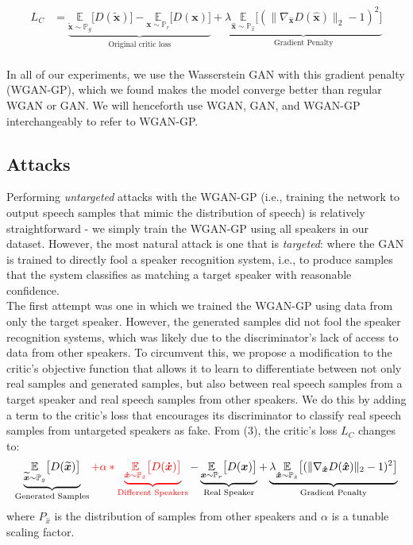 \begin{align}
    L_C &= \underbrace{\underset{\boldsymbol{\widetilde{x}} \sim \mathbb{P}_{g}}{\mathbb{E}}  \big[D(\boldsymbol{\widetilde{x}})\big] - \underset{\boldsymbol{x} \sim \mathbb{P}_{r}}{\mathbb{E}}  \big[D(\boldsymbol{x})\big]}_\text{Original critic loss}  + \underbrace{\lambda \underset{\boldsymbol{\hat{x}} \sim \mathbb{P}_{\hat{x}}}{\mathbb{E}}  \big[(\lVert \nabla_{\boldsymbol{\hat{x}}} D(\boldsymbol{\hat{x}}) \rVert_2 - 1)^2\big]}_\text{Gradient Penalty}
\end{align} \\
In all of our experiments, we use the Wasserstein GAN with this gradient penalty (WGAN-GP), which we found makes the model converge better than regular WGAN or GAN. We will henceforth use WGAN, GAN, and WGAN-GP interchangeably to refer to WGAN-GP.
\subsection{Attacks}
Performing \textit{untargeted} attacks with the WGAN-GP (i.e., training the network to output speech samples that mimic the distribution of speech) is relatively straightforward - we simply train the WGAN-GP using all speakers in our dataset. However, the most natural attack is one that is \textit{targeted}: where the GAN is trained to directly fool
a speaker recognition system, i.e., to produce samples that the system
classifies as matching a target speaker with reasonable confidence. \\
The first attempt was one in which we trained the WGAN-GP using data from only the target speaker. However, the generated samples did not fool
the speaker recognition systems, which was likely due to the discriminator's lack of access to data from other speakers. To circumvent this, we propose a 
modification to the critic's objective function that allows it to learn to 
differentiate between not only real samples and generated samples, but also between real speech samples from a target 
speaker and real speech samples from other speakers. We do this by adding a term 
to the critic's loss that encourages its discriminator to classify real speech 
samples from untargeted speakers as fake. From (3), the critic's loss $L_C$ changes to:
\begin{align}
    \underbrace{\underset{\boldsymbol{\widetilde{x}} \sim \mathbb{P}_{g}}{\mathbb{E}}  \big[D(\boldsymbol{\widetilde{x}})\big]}_\text{Generated Samples} \color{red} + \alpha * \underbrace{\underset{\boldsymbol{\dot{x}} \sim \mathbb{P}_{\dot{x}}}{\mathbb{E}}  \big[D(\boldsymbol{\dot{x}})\big]}_\text{Different Speakers} \color{black} - \underbrace{\underset{\boldsymbol{x} \sim \mathbb{P}_{r}}{\mathbb{E}}  \big[D(\boldsymbol{x})\big]}_\text{Real Speaker}  + \underbrace{\lambda \underset{\boldsymbol{\hat{x}} \sim \mathbb{P}_{\hat{x}}}{\mathbb{E}}  \big[(\lVert \nabla_{\boldsymbol{\hat{x}}} D(\boldsymbol{\hat{x}}) \rVert_2 - 1)^2\big]}_\text{Gradient Penalty}
\end{align}
where $P_{\hat{x}}$ is the distribution of samples from other speakers and
$\alpha$ is a tunable scaling factor. 